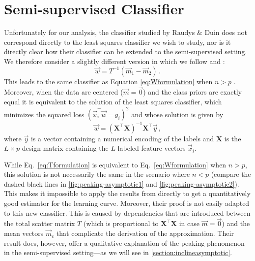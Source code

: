 \documentclass[runningheads,a4paper]{llncs}\usepackage[]{graphicx}\usepackage[]{color}
\begin{document}
\section{Semi-supervised Classifier} \label{section:semi-supervised}
Unfortunately for our analysis, the classifier studied by Raudys \& Duin does not correspond directly to the least squares classifier we wish to study, nor is it directly clear how their classifier can be extended to the semi-supervised setting.
We therefore consider a slightly different version in which we follow \cite{Duin1995} and \cite{Fan2008}:
\begin{equation}
\vec{w} = T^{-1} (\vec{m}_1-\vec{m}_2) \label{eq:Tformulation} \, .
\end{equation}
This leads to the same classifier as Equation \eqref{eq:Wformulation} when $n>p$ \cite{Duin1995}. Moreover, when the data are centered ($\vec{m}=\vec{0}$) and the class priors are exactly equal it is equivalent to the solution of the least squares classifier, which minimizes the squared loss $(\vec{x}_i^\top \vec{w} - y_i)^2$ and whose solution is given by
\begin{equation}
\vec{w} = (\mathbf{X}^\top \mathbf{X})^{-1} \mathbf{X}^\top \vec{y} \, , \label{eq:solutionsupervised}
\end{equation}
where $\vec{y}$ is a vector containing a numerical encoding of the labels and $\mathbf{X}$ is the $L \times p$ design matrix containing the $L$ labeled feature vectors $\vec{x}_i$.

While Eq.~\eqref{eq:Tformulation} is equivalent to Eq.~\eqref{eq:Wformulation} when $n>p$, this solution is not necessarily the same in the scenario where $n<p$ (compare the dashed black lines in \cref{fig:peaking-asymptotic1} and \cref{fig:peaking-asymptotic2}). This makes it impossible to apply the results from \cite{Raudys1998} directly to get a quantitatively good estimator for the learning curve. Moreover, their proof is not easily adapted to this new classifier. This is caused by dependencies that are introduced between the total scatter matrix $T$ (which is proportional to $\mathbf{X}^\top \mathbf{X}$ in case $\vec{m}=\vec{0}$) and the mean vectors $\vec{m}_c$ that complicate the derivation of the approximation. Their result does, however, offer a qualitative explanation of the peaking phenomenon in the semi-supervised setting---as we will see in \cref{section:inclineasymptotic}.
\end{document}
